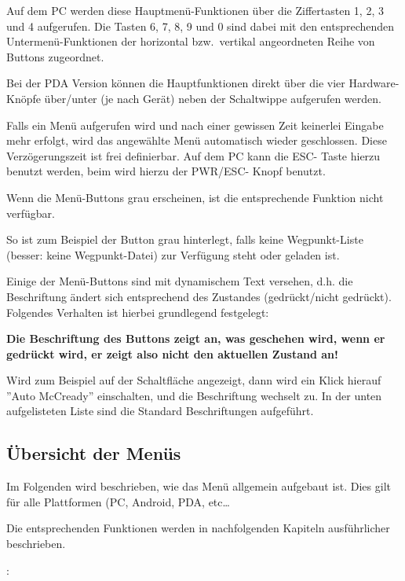 Auf dem \textsf{PC} werden diese Hauptmenü-Funktionen über die Ziffertasten 1, 2, 3 und  4 aufgerufen. Die Tasten 6, 7, 8, 9 und  0 sind dabei mit den
entsprechenden Untermenü-Funktionen der horizontal bzw.\ vertikal angeordneten Reihe von Buttons  zugeordnet.

Bei der PDA Version können die Hauptfunktionen direkt über die vier Hardware-Knöpfe über/unter (je nach Gerät) neben der Schaltwippe aufgerufen werden.

Falls ein Menü aufgerufen wird und nach einer gewissen Zeit keinerlei Eingabe mehr erfolgt, wird das angewählte Menü automatisch wieder geschlossen.  Diese Verzögerungszeit ist frei definierbar.  Auf dem \textsf{PC} kann die ESC- Taste hierzu benutzt werden, beim  \al wird hierzu der PWR/ESC- Knopf benutzt.

Wenn die Menü-Buttons grau erscheinen, ist die entsprechende Funktion nicht verfügbar.

So ist zum Beispiel der Button \textcolor{white}{} grau hinterlegt, falls keine Wegpunkt-Liste (besser: keine Wegpunkt-Datei) zur Verfügung steht oder geladen ist.

Einige der Menü-Buttons sind mit dynamischem Text versehen, d.h. die Beschriftung ändert sich entsprechend des Zustandes (gedrückt/nicht gedrückt). Folgendes Verhalten ist hierbei grundlegend festgelegt:


\textbf{Die Beschriftung des Buttons zeigt an, \textcolor[rgb]{0.72,0.03,0.20}{ was geschehen wird}, wenn er \warning gedrückt wird, er zeigt also nicht den aktuellen Zustand an!}

Wird zum Beispiel auf der Schaltfläche   angezeigt, dann wird ein Klick hierauf  ''Auto McCready'' \textcolor[rgb]{0.72,0.03,0.20}{ einschalten}, und die Beschriftung wechselt zu\hspace{-3pt}.
In der unten aufgelisteten Liste sind die Standard Beschriftungen aufgeführt.

\subsection*{Übersicht der Menüs }
Im Folgenden wird beschrieben, wie das Menü allgemein aufgebaut ist.
Dies gilt für alle Plattformen (\textsf{PC}, Android, \al PDA, etc\dots

Die entsprechenden Funktionen werden in nachfolgenden Kapiteln ausführlicher beschrieben.

\textsf{\al}:

